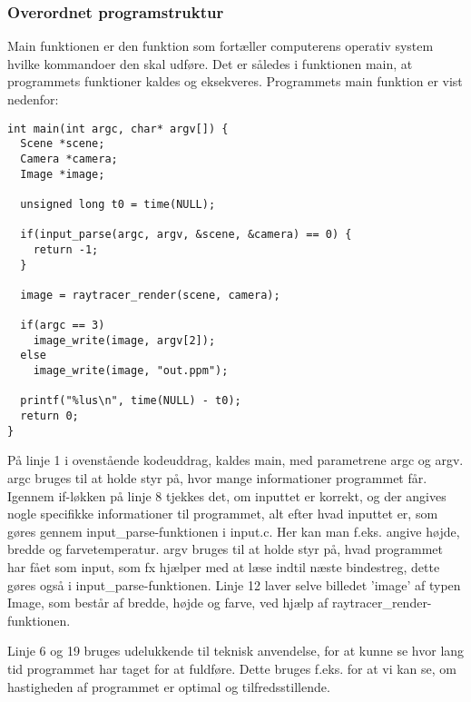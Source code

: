 \subsubsection{Overordnet programstruktur}
Main funktionen er den funktion som fortæller computerens operativ system hvilke kommandoer den skal udføre. Det er således i funktionen main, at programmets funktioner kaldes og eksekveres. Programmets main funktion er vist nedenfor:

\begin{lstlisting}[style=Cstyle, caption=Main]
int main(int argc, char* argv[]) {
  Scene *scene;
  Camera *camera;
  Image *image;

  unsigned long t0 = time(NULL);
  
  if(input_parse(argc, argv, &scene, &camera) == 0) {
    return -1;
  }
  
  image = raytracer_render(scene, camera);
  
  if(argc == 3)
    image_write(image, argv[2]);
  else
    image_write(image, "out.ppm");
  
  printf("%lus\n", time(NULL) - t0);
  return 0;
}
\end{lstlisting}

På linje 1 i ovenstående kodeuddrag, kaldes main, med parametrene argc og argv. argc bruges til at holde styr på, hvor mange informationer programmet får. Igennem if-løkken på linje 8 tjekkes det, om inputtet er korrekt, og der angives nogle specifikke informationer til programmet, alt efter hvad inputtet er, som gøres gennem input\_parse-funktionen i input.c. Her kan man f.eks. angive højde, bredde og farvetemperatur. argv bruges til at holde styr på, hvad programmet har fået som input, som fx hjælper med at læse indtil næste bindestreg, dette gøres også i input\_parse-funktionen. Linje 12 laver selve billedet 'image' af typen Image, som består af bredde, højde og farve, ved hjælp af raytracer\_render-funktionen. 

Linje 6 og 19 bruges udelukkende til teknisk anvendelse, for at kunne se hvor lang tid programmet har taget for at fuldføre. Dette bruges f.eks. for at vi kan se, om hastigheden af programmet er optimal og tilfredsstillende. 
